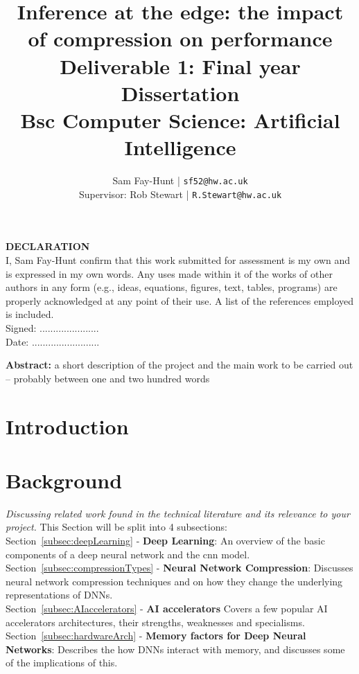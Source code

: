 \documentclass[11pt]{article}
\begin{document}
\title{%
	\bf Inference at the edge: the impact of compression on performance\\ 
	\large Deliverable 1: Final year Dissertation \\
	Bsc Computer Science: Artificial Intelligence}

\author{
	Sam Fay-Hunt | \texttt{sf52@hw.ac.uk}\\
	Supervisor: Rob Stewart | \texttt{R.Stewart@hw.ac.uk}
}

\maketitle
\thispagestyle{empty}
\pagebreak

\textbf{DECLARATION}\\
I, Sam Fay-Hunt confirm that this work submitted for assessment is my own and is expressed in
my own words. Any uses made within it of the works of other authors in any form (e.g., ideas,
equations, figures, text, tables, programs) are properly acknowledged at any point of their
use. A list of the references employed is included.\\
Signed: ......................\\
Date: .........................
\thispagestyle{empty}
\pagebreak

\textbf{Abstract:} a short description of the project and the main work to be carried out – probably
between one and two hundred words
\thispagestyle{empty}
\pagebreak

\tableofcontents
\thispagestyle{empty}
\pagebreak


\setcounter{page}{1}

\section{Introduction}


\pagebreak
\section{Background}
\emph{Discussing related work found in the technical literature and its relevance to your project.}
This Section will be split into 4 subsections:\\
Section~\ref{subsec:deepLearning} - \textbf{Deep Learning}: An overview of the basic components of a deep neural network and the \acrshort{cnn} model.\\
Section~\ref{subsec:compressionTypes} - \textbf{Neural Network Compression}: Discusses neural network compression techniques and on how they change the underlying representations of DNNs.\\
Section~\ref{subsec:AIaccelerators} - \textbf{AI accelerators} Covers a few popular AI accelerators architectures, their strengths, weaknesses and specialisms.\\
Section~\ref{subsec:hardwareArch} - \textbf{Memory factors for Deep Neural Networks}: Describes the how DNNs interact with memory, and discusses some of the implications of this.
\end{document}
